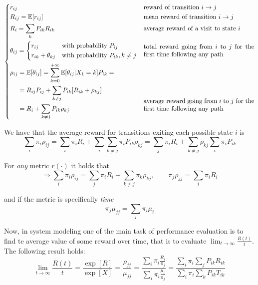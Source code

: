 \begin{equation*}
	\begin{dcases}
		r_{ij} & \text{reward of transition } i\rightarrow j \\
		R_{ij} = \exp[r_{ij}] & \text{mean reward of transition } i\rightarrow j\\
		R_i = \sum_k P_{ik} R_{ik} & \text{average reward of a visit to state } i\\
		\theta_{ij} =
			\begin{dcases}
				r_{ij} &\text{with probability } P_{ij}\\
				r_{ik}+\theta_{kj} &\text{with probability } P_{ik}, k\neq j
			\end{dcases}
			& \parbox[c]{.5\textwidth}{total reward going from $i$ to $j$ for the first time following any path} \\
			\begin{aligned}[b]
				\rho_{ij} &= \exp[\theta_{ij}] = \sum_{k=0}^{+\infty}\exp[\theta_{ij}| X_1=k] P_{ik} =\\
				&= R_{ij}P_{ij} +\sum_{k \neq j} P_{ik} [R_{ik}+\rho_{kj}] \\
				&= R_i + \sum_{k \neq j}P_{ik}\rho_{kj}
			\end{aligned} & \parbox[b]{.5\textwidth}{average reward going from $i$ to $j$ for the first time following any path}
	\end{dcases}
\end{equation*}

We have that the average reward for transitions exiting each possible state $i$ is
\begin{equation*}
\sum_i \pi_i \rho_{ij} = \sum_i \pi_i R_i + \sum_i \sum_{k \neq j} \pi_i P_{ik} \rho_{kj} = \sum_j \pi_i R_i + \sum_{k \neq j}\rho_{kj}\sum_i\pi_i P_{ik}
\end{equation*}

For \emph{any} metric $r(\cdot)$ it holds that
\begin{equation}
\Rightarrow\sum_i \pi_i \rho_{ij} = \sum_j \pi_i R_i + \sum_{k \neq j}\pi_k\rho_{kj},\qquad \pi_j\rho_{jj} = \sum_i \pi_i R_i
\end{equation}

and if the metric is specifically \emph{time}
\begin{equation}
\pi_j \mu_{jj} = \sum_i \pi_i \mu_i
\end{equation}

Now, in system modeling one of the main task of performance evaluation is to find te average value of some reward over time, that is to evaluate $\lim_{t \to \infty}\frac{R(t)}{t}$. The following result holds:
\begin{equation}
\lim_{t \to \infty}\frac{R(t)}{t} = \frac{\exp[R]}{\exp[X]} = \frac{\rho_{jj}}{\mu_{jj}} = \frac{\sum_i \pi_i \frac{R_i}{\pi_j}}{\sum_i \pi_i \frac{\mu_i}{\pi_j}} = \frac{\sum_i \pi_i \sum_j P_{ik} R_{ik}}{\sum_i \pi_i \sum_k P_{ik}T_{ik}}
\end{equation}

